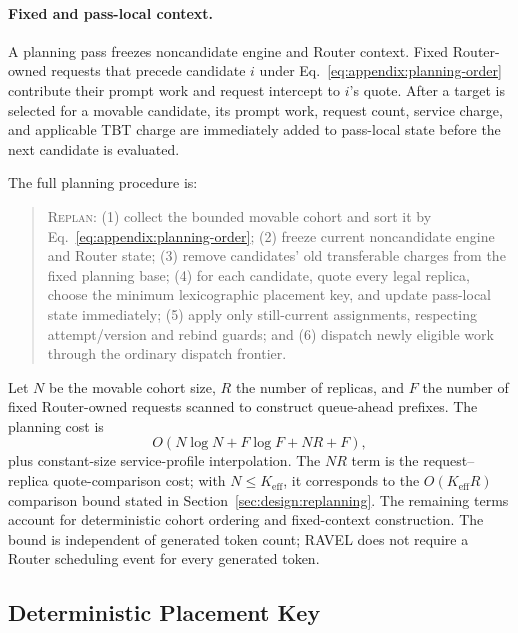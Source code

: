 \documentclass[letterpaper,twocolumn,10pt]{article}
\begin{document}
\paragraph{Fixed and pass-local context.}
A planning pass freezes noncandidate engine and Router context.
Fixed Router-owned requests that precede candidate $i$ under
Eq.~\ref{eq:appendix:planning-order} contribute their prompt work and request
intercept to $i$'s quote.
After a target is selected for a movable candidate, its prompt work, request
count, service charge, and applicable TBT charge are immediately added to
pass-local state before the next candidate is evaluated.

The full planning procedure is:
\begin{quote}
\textsc{Replan}:
(1) collect the bounded movable cohort and sort it by
Eq.~\ref{eq:appendix:planning-order};
(2) freeze current noncandidate engine and Router state;
(3) remove candidates' old transferable charges from the fixed planning base;
(4) for each candidate, quote every legal replica, choose the minimum
lexicographic placement key, and update pass-local state immediately;
(5) apply only still-current assignments, respecting attempt/version and
rebind guards; and
(6) dispatch newly eligible work through the ordinary dispatch frontier.
\end{quote}

Let $N$ be the movable cohort size, $R$ the number of replicas, and $F$ the
number of fixed Router-owned requests scanned to construct queue-ahead
prefixes.
The planning cost is
\begin{equation}
    O(N\log N+F\log F+NR+F),
    \label{eq:appendix:planner-complexity}
\end{equation}
plus constant-size service-profile interpolation.
The $NR$ term is the request--replica quote-comparison cost; with
$N\le K_{\mathrm{eff}}$, it corresponds to the
$O(K_{\mathrm{eff}}R)$ comparison bound stated in
Section~\ref{sec:design:replanning}.
The remaining terms account for deterministic cohort ordering and fixed-context
construction.
The bound is independent of generated token count; RAVEL does not require a
Router scheduling event for every generated token.


\subsection{Deterministic Placement Key}
\label{sec:appendix:placement-key}
\end{document}
